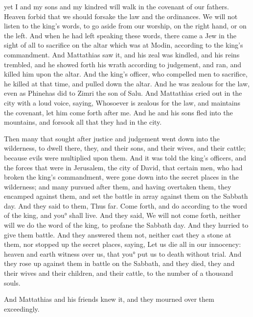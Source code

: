 {yet I and my sons and my kindred will walk in the covenant of our fathers.
 Heaven forbid that we should forsake the law and the ordinances.
We will not listen to the king’s words, to go aside from our worship, on the right hand, or on the left.
And when he had left speaking these words, there came a Jew in the sight of all to sacrifice on the altar which was at Modin, according to the king’s commandment.
And Mattathias saw it, and his zeal was kindled, and his reins trembled, and he showed forth his wrath according to judgement, and ran, and killed him upon the altar.
And the king’s officer, who compelled men to sacrifice, he killed at that time, and pulled down the altar.
And he was zealous for the law, even as Phinehas did to Zimri the son of Salu.
And Mattathias cried out in the city with a loud voice, saying, Whosoever is zealous for the law, and maintains the covenant, let him come forth after me.
And he and his sons fled into the mountains, and forsook all that they had in the city.
\par }{\PP {}Then many that sought after justice and judgement went down into the wilderness, to dwell there,
they, and their sons, and their wives, and their cattle; because evils were multiplied upon them.
And it was told the king’s officers, and the forces that were in Jerusalem, the city of David, that certain men, who had broken the king’s commandment, were gone down into the secret places in the wilderness;
and many pursued after them, and having overtaken them, they encamped against them, and set the battle in array against them on the Sabbath day.
And they said to them, Thus far. Come forth, and do according to the word of the king, and you° shall live.
And they said, We will not come forth, neither will we do the word of the king, to profane the Sabbath day.
And they hurried to give them battle.
And they answered them not, neither cast they a stone at them, nor stopped up the secret places,
saying, Let us die all in our innocency: heaven and earth witness over us, that you° put us to death without trial.
And they rose up against them in battle on the Sabbath, and they died, they and their wives and their children, and their cattle, to the number of a thousand
 souls.
\par }{\PP {}And Mattathias and his friends knew it, and they mourned over them exceedingly.
}
